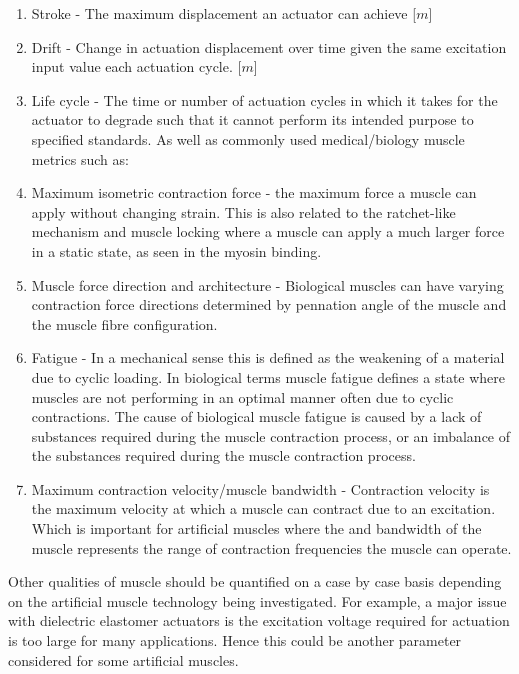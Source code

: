 \begin{enumerate}
    \item Stroke - The maximum displacement an actuator can achieve [$m$]
    \item Drift - Change in actuation displacement over time given the same excitation input value each actuation cycle. [$m$] \nocite{Hussain2019}
    \item Life cycle - The time or number of actuation cycles in which it takes for the actuator to degrade such that it cannot perform its intended purpose to specified standards.
\newline
\newline
    As well as commonly used medical/biology muscle metrics such as:
\newline
    \item Maximum isometric contraction force - the maximum force a muscle can apply without changing strain. This is also related to the ratchet-like mechanism and muscle locking where a muscle can apply a much larger force in a static state, as seen in the myosin binding\citep{Cross2006}.
    \item Muscle force direction and architecture - Biological muscles can have varying contraction force directions determined by pennation angle of the muscle and the muscle fibre configuration.
    \item Fatigue - In a mechanical sense this is defined as the weakening of a material due to cyclic loading. In biological terms muscle fatigue defines a state where muscles are not performing in an optimal manner often due to cyclic contractions. The cause of biological muscle fatigue is caused by a lack of substances required during the muscle contraction process, or an imbalance of the substances required during the muscle contraction process\citep{Davis2000,Wan2017}.
    \item Maximum contraction velocity/muscle bandwidth - Contraction velocity is the maximum velocity at which a muscle can contract due to an excitation. Which is important for artificial muscles where the and bandwidth of the muscle represents the range of contraction frequencies the muscle can operate.
\end{enumerate}
Other qualities of muscle should be quantified on a case by case basis depending on the artificial muscle technology being investigated. For example, a major issue with dielectric elastomer actuators is the excitation voltage required for actuation is too large for many applications. Hence this could be another parameter considered for some artificial muscles.

